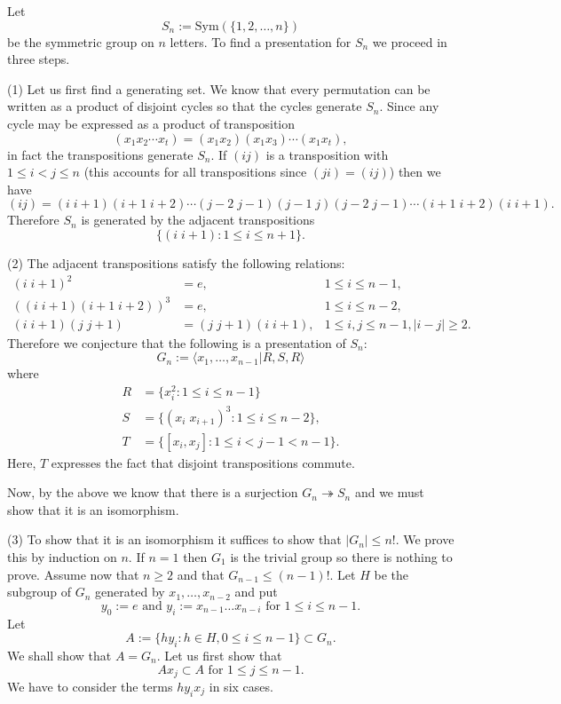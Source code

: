 \begin{eg} Let \[S_n := \mathrm{Sym}(\{1,2,\dots,n\})\] be
    the symmetric group on $n$ letters. To find a presentation for $S_n$ we
    proceed in three steps.

    (1) Let us first find a generating set. We know that every permutation can
    be written as a product of disjoint cycles so that the cycles generate
    $S_n$.  Since any cycle may be expressed as a product of transposition
    \[(x_1x_2\cdots x_t) = (x_1x_2)(x_1x_3)\cdots(x_1 x_t), \] in fact the
    transpositions generate $S_n$. If $(ij)$ is a transposition with $1 \le
    i<j \le n$ (this accounts for all transpositions since $(ji) = (ij)$) then
    we have \[(ij) = (i\; i+1)(i+1\; i+2) \cdots (j-2\; j-1) (j-1\; j) (j-2\;
    j-1) \cdots (i+1\; i+2)(i\; i+1).\] Therefore $S_n$ is generated by the
    adjacent transpositions \[\{(i\; i+1) : 1 \le i \le n+1\}.\]

    (2) The adjacent transpositions satisfy the following relations:
    \begin{align*}
        (i\; i+1)^2 &= e,& 1 \le i \le n-1,\\
        ( (i\; i+1)(i+1\; i+2) )^3 & = e,& 1 \le i \le n-2,\\
        (i \; i+1)(j\; j+1) & = (j\; j+1)(i\; i+1),& 1 \le i,j \le n-1, |i-j| \ge 2.
    \end{align*}
    Therefore we conjecture that the following is a presentation of $S_n$:
    \[G_n:= \langle x_1, \dots, x_{n-1} | R, S, R\rangle\] where
    \begin{align*}
        R &= \{x_i^2 : 1 \le i \le n-1\}\\
        S &= \{(x_i\; x_{i+1})^3 : 1 \le i \le n-2\},\\
        T &= \{[x_i,x_j] : 1 \le i < j-1 < n-1\}.
    \end{align*} Here, $T$ expresses the fact that disjoint transpositions commute.

    Now, by the above we know that there is a surjection $G_n
    \twoheadrightarrow S_n$ and we must show that it is an isomorphism.

    (3) To show that it is an isomorphism it suffices to show that $|G_n| \le
    n!$. We prove this by induction on $n$. If $n=1$ then $G_1$ is the trivial
    group so there is nothing to prove. Assume now that $n \ge 2$ and that
    $G_{n-1} \le (n-1)!.$ Let $H$ be the subgroup of $G_n$ generated by $x_1,
    \dots, x_{n-2}$ and put \[y_0 := e \text{ and } y_i := x_{n-1}\dots x_{n-i}
    \text{ for } 1 \le i \le n-1. \] Let \[A := \{h y_i : h\in H, 0 \le i \le
    n-1\} \subset G_n.\] We shall show that $A = G_n$. Let us first show that
    \[Ax_j \subset A \text{ for } 1 \le j \le n-1.\] We have to consider the
    terms $hy_ix_j$ in six cases.


\end{eg}
